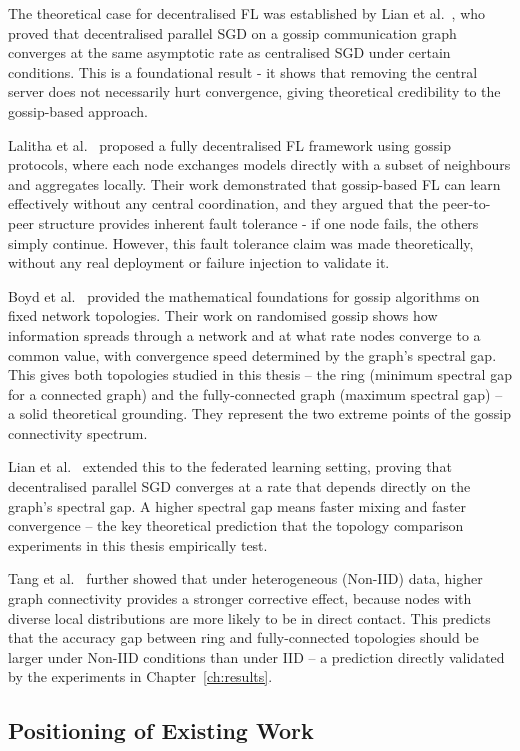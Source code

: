 \documentclass[12pt]{report}
\begin{document}
The theoretical case for decentralised FL was established by Lian et
al.~\cite{lian2017}, who proved that decentralised parallel SGD on a gossip
communication graph converges at the same asymptotic rate as centralised SGD
under certain conditions. This is a foundational result - it shows that
removing the central server does not necessarily hurt convergence, giving
theoretical credibility to the gossip-based approach.

Lalitha et al.~\cite{lalitha2019} proposed a fully decentralised FL framework
using gossip protocols, where each node exchanges models directly with a subset
of neighbours and aggregates locally. Their work demonstrated that gossip-based
FL can learn effectively without any central coordination, and they argued that
the peer-to-peer structure provides inherent fault tolerance - if one node
fails, the others simply continue. However, this fault tolerance claim was made
theoretically, without any real deployment or failure injection to validate it.

Boyd et al.~\cite{boyd2006} provided the mathematical foundations for gossip
algorithms on fixed network topologies. Their work on randomised gossip shows
how information spreads through a network and at what rate nodes converge
to a common value, with convergence speed determined by the graph's spectral
gap. This gives both topologies studied in this thesis -- the ring (minimum
spectral gap for a connected graph) and the fully-connected graph (maximum
spectral gap) -- a solid theoretical grounding. They represent the two extreme
points of the gossip connectivity spectrum.

Lian et al.~\cite{lian2017} extended this to the federated learning setting,
proving that decentralised parallel SGD converges at a rate that depends
directly on the graph's spectral gap. A higher spectral gap means faster
mixing and faster convergence -- the key theoretical prediction that the
topology comparison experiments in this thesis empirically test.

Tang et al.~\cite{tang2018} further showed that under heterogeneous (Non-IID)
data, higher graph connectivity provides a stronger corrective effect, because
nodes with diverse local distributions are more likely to be in direct contact.
This predicts that the accuracy gap between ring and fully-connected topologies
should be larger under Non-IID conditions than under IID -- a prediction
directly validated by the experiments in Chapter~\ref{ch:results}.

\subsection*{Positioning of Existing Work}
 
\end{document}
